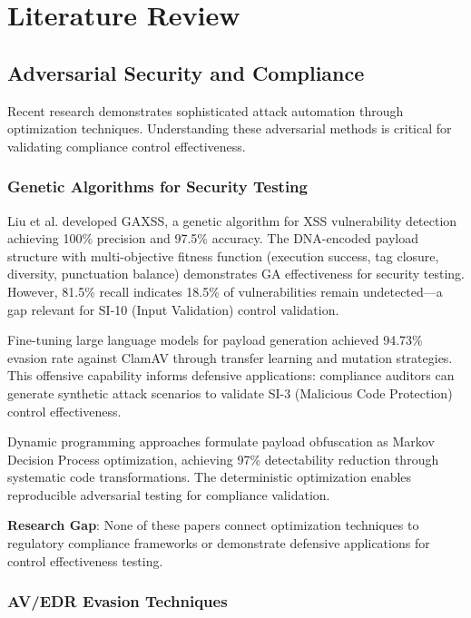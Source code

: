 \documentclass[11pt,conference]{IEEEtran}
\begin{document}
\section{Literature Review}

\subsection{Adversarial Security and Compliance}

Recent research demonstrates sophisticated attack automation through optimization techniques. Understanding these adversarial methods is critical for validating compliance control effectiveness.

\subsubsection{Genetic Algorithms for Security Testing}

Liu et al. \cite{ga_xss_paper} developed GAXSS, a genetic algorithm for XSS vulnerability detection achieving 100\% precision and 97.5\% accuracy. The DNA-encoded payload structure with multi-objective fitness function (execution success, tag closure, diversity, punctuation balance) demonstrates GA effectiveness for security testing. However, 81.5\% recall indicates 18.5\% of vulnerabilities remain undetected---a gap relevant for SI-10 (Input Validation) control validation.

Fine-tuning large language models for payload generation \cite{llm_payload_paper} achieved 94.73\% evasion rate against ClamAV through transfer learning and mutation strategies. This offensive capability informs defensive applications: compliance auditors can generate synthetic attack scenarios to validate SI-3 (Malicious Code Protection) control effectiveness.

Dynamic programming approaches \cite{dp_payload_paper} formulate payload obfuscation as Markov Decision Process optimization, achieving 97\% detectability reduction through systematic code transformations. The deterministic optimization enables reproducible adversarial testing for compliance validation.

\textbf{Research Gap}: None of these papers connect optimization techniques to regulatory compliance frameworks or demonstrate defensive applications for control effectiveness testing.

\subsubsection{AV/EDR Evasion Techniques}
\end{document}
